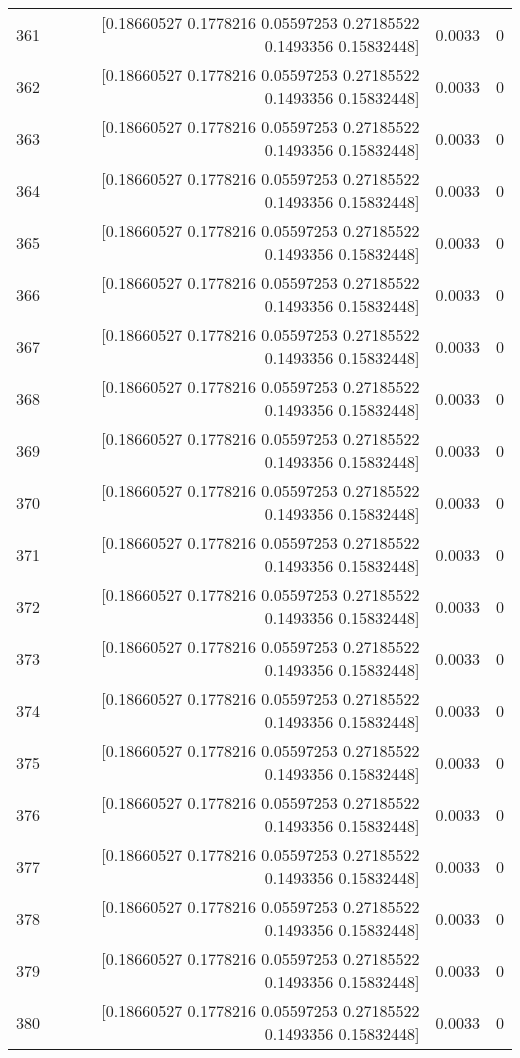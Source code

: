 \begin{longtable}{lrrr}
361 & [0.18660527 0.1778216  0.05597253 0.27185522 0.1493356  0.15832448] & 0.0033 & 0 \\
362 & [0.18660527 0.1778216  0.05597253 0.27185522 0.1493356  0.15832448] & 0.0033 & 0 \\
363 & [0.18660527 0.1778216  0.05597253 0.27185522 0.1493356  0.15832448] & 0.0033 & 0 \\
364 & [0.18660527 0.1778216  0.05597253 0.27185522 0.1493356  0.15832448] & 0.0033 & 0 \\
365 & [0.18660527 0.1778216  0.05597253 0.27185522 0.1493356  0.15832448] & 0.0033 & 0 \\
366 & [0.18660527 0.1778216  0.05597253 0.27185522 0.1493356  0.15832448] & 0.0033 & 0 \\
367 & [0.18660527 0.1778216  0.05597253 0.27185522 0.1493356  0.15832448] & 0.0033 & 0 \\
368 & [0.18660527 0.1778216  0.05597253 0.27185522 0.1493356  0.15832448] & 0.0033 & 0 \\
369 & [0.18660527 0.1778216  0.05597253 0.27185522 0.1493356  0.15832448] & 0.0033 & 0 \\
370 & [0.18660527 0.1778216  0.05597253 0.27185522 0.1493356  0.15832448] & 0.0033 & 0 \\
371 & [0.18660527 0.1778216  0.05597253 0.27185522 0.1493356  0.15832448] & 0.0033 & 0 \\
372 & [0.18660527 0.1778216  0.05597253 0.27185522 0.1493356  0.15832448] & 0.0033 & 0 \\
373 & [0.18660527 0.1778216  0.05597253 0.27185522 0.1493356  0.15832448] & 0.0033 & 0 \\
374 & [0.18660527 0.1778216  0.05597253 0.27185522 0.1493356  0.15832448] & 0.0033 & 0 \\
375 & [0.18660527 0.1778216  0.05597253 0.27185522 0.1493356  0.15832448] & 0.0033 & 0 \\
376 & [0.18660527 0.1778216  0.05597253 0.27185522 0.1493356  0.15832448] & 0.0033 & 0 \\
377 & [0.18660527 0.1778216  0.05597253 0.27185522 0.1493356  0.15832448] & 0.0033 & 0 \\
378 & [0.18660527 0.1778216  0.05597253 0.27185522 0.1493356  0.15832448] & 0.0033 & 0 \\
379 & [0.18660527 0.1778216  0.05597253 0.27185522 0.1493356  0.15832448] & 0.0033 & 0 \\
380 & [0.18660527 0.1778216  0.05597253 0.27185522 0.1493356  0.15832448] & 0.0033 & 0 \\

\end{longtable}
